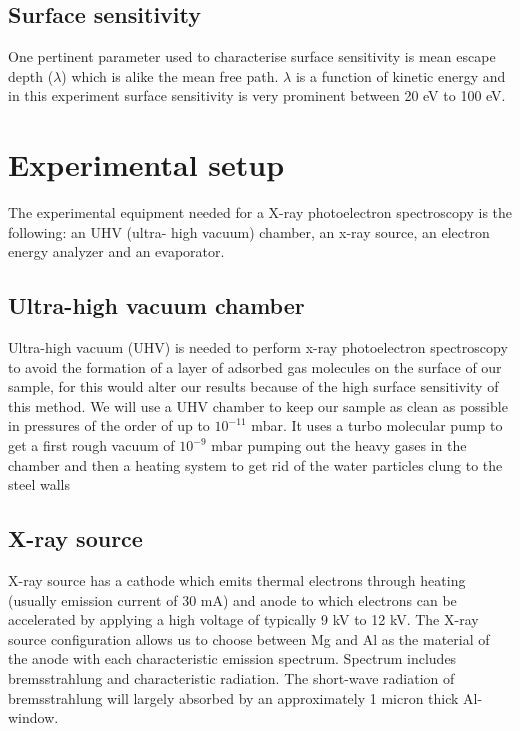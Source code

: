 \documentclass{article}
\begin{document}
\subsection{Surface sensitivity}
One pertinent parameter used to characterise surface sensitivity is mean escape depth ($\lambda$) which is alike the mean free path. $\lambda$ is a function of kinetic energy and in this experiment surface sensitivity is very prominent between 20 eV to 100 eV.
\section{Experimental setup}
The experimental equipment needed for a X-ray photoelectron spectroscopy is the following: an UHV (ultra-
high vacuum) chamber, an x-ray source, an electron energy analyzer and an evaporator.
\subsection{Ultra-high vacuum chamber}
Ultra-high vacuum (UHV) is needed to perform x-ray photoelectron spectroscopy to avoid the formation of
a layer of adsorbed gas molecules on the surface of our sample, for this would alter our results because of the high surface sensitivity of this method. We will use a UHV chamber to keep our sample as clean as possible in pressures of the order of up to $10^{-11}$ mbar. It uses a turbo molecular pump to get a first rough vacuum of $10^{-9}$ mbar pumping out the heavy gases in the chamber and then a heating system to get rid of the water particles clung to the steel walls
\subsection{X-ray source}
X-ray source has a cathode which emits thermal electrons through heating (usually emission current of 30 mA) and anode to which electrons can be accelerated by applying a high voltage of typically 9 kV to 12 kV. The X-ray source configuration allows us to choose between Mg and Al as the material of the anode with each characteristic emission spectrum. Spectrum includes bremsstrahlung and characteristic radiation. The short-wave radiation of bremsstrahlung will largely absorbed by an approximately 1 micron thick Al-window.
\end{document}
